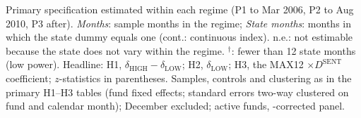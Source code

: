 \begin{table}[!htbp]
\begin{minipage}{\tabletempwidth}
\ifdim\wd\tabletempbox>\linewidth
  \resizebox{\linewidth}{!}{\usebox{\tabletempbox}}
\else
  \usebox{\tabletempbox}
\fi
\par\medskip
\begin{singlespace}\tablefont\noindent
Primary specification estimated within each regime (P1 to Mar 2006, P2 to Aug 2010, P3 after). \textit{Months}: sample months in the regime; \textit{State months}: months in which the state dummy equals one (cont.: continuous index). n.e.: not estimable because the state does not vary within the regime. $^{\dagger}$: fewer than 12 state months (low power). Headline: H1, $\delta_{\text{HIGH}}-\delta_{\text{LOW}}$; H2, $\delta_{\text{LOW}}$; H3, the MAX12 $\times D^{\text{SENT}}$ coefficient; $z$-statistics in parentheses. Samples, controls and clustering as in the primary H1--H3 tables (fund fixed effects; standard errors two-way clustered on fund and calendar month); December excluded; active funds, \textcite{Evans2010}-corrected panel.
\end{singlespace}
\end{minipage}
\end{table}

